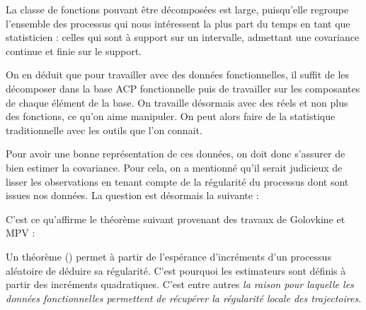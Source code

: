 \begin{rem}
	La classe de fonctions pouvant être décomposées est large, puisqu'elle regroupe l'ensemble des processus qui nous intéressent la plus part du temps en tant que statisticien : celles qui sont à support sur un intervalle, admettant une covariance continue et finie sur le support.
\end{rem}

On en déduit que pour travailler avec des données fonctionnelles, il suffit de les décomposer dans la base ACP fonctionnelle puis de travailler sur les composantes de chaque élément de la base. On travaille désormais avec des réels et non plus des fonctions, ce qu'on aime manipuler. On peut alors faire de la statistique traditionnelle avec les outils que l'on connait.


\begin{propriete*}
	\noindent{}
\end{propriete*}

Pour avoir une bonne représentation de ces données, on doit donc s'assurer de bien estimer la covariance. Pour cela, on a mentionné qu'il serait judicieux de lisser les observations en tenant compte de la régularité du processus dont sont issues nos données. La question est désormais la suivante :


C'est ce qu'affirme le théorème suivant provenant des travaux de Golovkine et MPV :

\bigskip

\noindent\begin{minipage}{\textwidth}
\begin{thm*}
	\noindent{}
	\label{thm*:regularite_locale}
\end{thm*}
\end{minipage}
\begin{rem}
	Un théorème () permet à partir de l'espérance d'incréments d'un processus aléatoire de déduire sa régularité.
	C'est pourquoi les estimateurs sont définis à partir des incréments quadratiques. C'est entre autres \emph{la raison pour laquelle les données fonctionnelles permettent de récupérer la régularité locale des trajectoires}.

	\label{rem:kolmo_continuite}
\end{rem}
